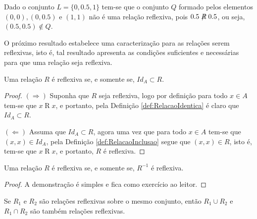 \begin{example}
	Dado o conjunto $L = \{0, 0.5, 1\}$ tem-se que o conjunto $Q$ formado pelos elementos $(0,0), (0,0.5)$ e $(1, 1)$ não é uma relação reflexiva, pois $0.5\centernot{R} 0.5$, ou seja, $(0.5, 0.5) \notin Q$.
\end{example}

O próximo resultado estabelece uma caracterização para as relações serem reflexivas, isto é, tal resultado apresenta as condições suficientes e necessárias para que uma relação seja reflexiva.

\begin{theorem}\label{teo:CaracterizacaoRelacaoReflexivda}
	Uma relação $R$ é reflexiva se, e somente se, $Id_A \subset R$.
\end{theorem}

\begin{proof}
	$(\Rightarrow)$ Suponha que $R$ seja reflexiva, logo por definição para todo $x \in A$ tem-se que $x \mathrel{R} x$, e portanto, pela Definição \ref{def:RelacaoIdentica} é claro que $Id_A \subset R$.
	
	$(\Leftarrow)$ Assuma que $Id_A \subset R$, agora uma vez que para todo $x \in A$ tem-se que $(x, x) \in Id_A$, pela Definição \ref{def:RelacaoInclusao} segue que $(x, x) \in R$, isto é, tem-se que $x \mathrel{R} x$, e portanto, $R$ é reflexiva.
\end{proof}

\begin{corollary}\label{col:CaracterizacaoRelacaoReflexivda}
	Uma relação $R$ é reflexiva se, e somente se, $R^{-1}$ é reflexiva.
\end{corollary}

\begin{proof}
	A demonstração é simples e fica como exercício ao leitor.
\end{proof}

\begin{theorem}\label{teo:FechoAlgebricoRelacoesReflexivas}
	Se $R_1$ e $R_2$ são relações reflexivas sobre o mesmo conjunto, então $R_1 \cup R_2$ e $R_1 \cap R_2$ são também relações reflexivas.
\end{theorem}

